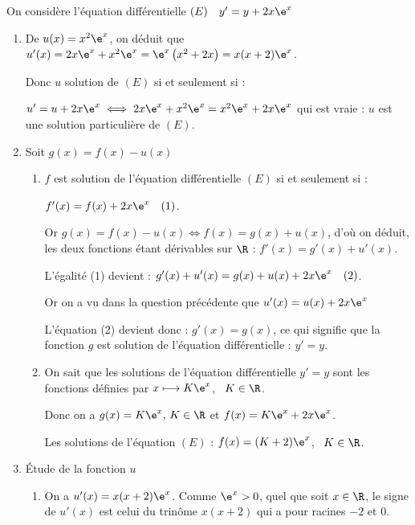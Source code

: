 \vspace{0.5cm}










On considère l’équation différentielle  $(E)\quad  y'=  y+ 2 x \e^x$
 

\smallskip

\begin{enumerate}
\item 
De $u(x) = x^2\e^x$, on déduit que $u'(x) = 2x\e^x +  x^2\e^x =  \e^x\left(x^2 + 2x \right) = x(x + 2)\e^x$.

Donc $u$ solution de $(E)$ si et seulement si :

$u' = u + 2x\e^x \iff 2x\e^x +  x^2\e^x = x^2\e^x + 2 x \e^x$ qui est vraie : $u$ est 
une solution particulière de $(E)$.
\item Soit $g(x)=f(x) - u(x)$



\smallskip

\begin{enumerate}
\item  
$f$ est solution de l'équation différentielle $(E)$ si et seulement si :

$f'(x) = f(x) + 2x\e^x \quad (1)$.

Or $g(x) = f(x) - u(x) \iff f(x) = g(x) + u(x)$, d'où on déduit, les deux fonctions étant dérivables sur $\R$ : $f'(x) = g'(x) + u'(x)$.

L'égalité (1) devient : $g'(x) + u'(x) = g(x) + u(x) + 2x\e^x \quad (2)$.

Or on a vu dans la question précédente que $u'(x) = u(x) + 2x\e^x$

L'équation (2) devient donc : $g'(x) = g(x)$, ce qui signifie que la fonction $g$ est solution de l'équation différentielle : $y' = y$.



\item 
On sait que les solutions de l'équation différentielle $y' = y$ sont les fonctions définies par $x \longmapsto K\e^x$, \, $K \in \R$.

Donc on a $g(x) = K \e^x, \, K \in \R$ et $f(x) = K \e^x + 2x\e^x$.

Les solutions de l'équation $(E)$ : $f(x) = (K + 2)\e^x$, \, $K \in \R$.
\end{enumerate}
\item Étude de la fonction $u $
	\begin{enumerate}
		\item 
On a $u'(x) = x(x + 2)\e^x$. Comme $\e^x > 0$, quel que soit $x \in \R$, le signe de $u'(x)$ est celui du trinôme $x(x + 2)$ qui a pour racines $- 2$ et $0$.


\end{enumerate}
\end{enumerate}
